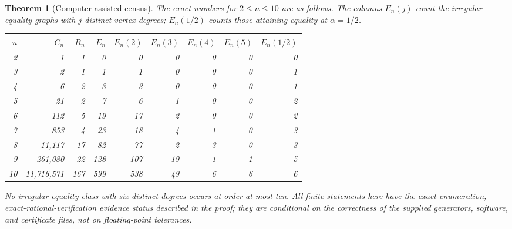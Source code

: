 \documentclass[11pt]{amsart}
\newtheorem{theorem}{Theorem}[section]
\theoremstyle{remark}
\begin{document}
\begin{theorem}[Computer-assisted census]\label{thm:census}
The exact numbers for $2\leq n\leq10$ are as follows. The columns
$E_n(j)$ count the irregular equality graphs with $j$ distinct
vertex degrees; $E_n(1/2)$ counts those attaining equality at
$\alpha=1/2$.
\begin{center}
\small
\begin{tabular}{r|r r r|r r r r|r}
$n$ & $C_n$ & $R_n$ & $E_n$ & $E_n(2)$ & $E_n(3)$ & $E_n(4)$ & $E_n(5)$ & $E_n(1/2)$\\\hline
2 & 1 & 1 & 0 & 0 & 0 & 0 & 0 & 0\\
3 & 2 & 1 & 1 & 1 & 0 & 0 & 0 & 1\\
4 & 6 & 2 & 3 & 3 & 0 & 0 & 0 & 1\\
5 & 21 & 2 & 7 & 6 & 1 & 0 & 0 & 2\\
6 & 112 & 5 & 19 & 17 & 2 & 0 & 0 & 2\\
7 & 853 & 4 & 23 & 18 & 4 & 1 & 0 & 3\\
8 & 11,117 & 17 & 82 & 77 & 2 & 3 & 0 & 3\\
9 & 261,080 & 22 & 128 & 107 & 19 & 1 & 1 & 5\\
10 & 11,716,571 & 167 & 599 & 538 & 49 & 6 & 6 & 6
\end{tabular}
\end{center}
No irregular equality class with six distinct degrees occurs
at order at most ten. All finite statements here have the
\emph{exact-enumeration, exact-rational-verification} evidence
status described in the proof; they are conditional on the
correctness of the supplied generators, software, and certificate
files, not on floating-point tolerances.
\end{theorem}
\end{document}
